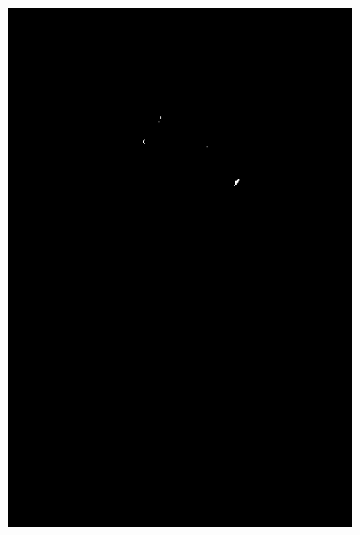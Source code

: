 \begin{figure}[h]
{\begin{subfigure}[b]{0.23\textwidth}
         \includegraphics[width=\textwidth]{images/results/cross/5_A_hgr2B_id10_1_ecu_hgr_bayes.png}
     \end{subfigure}}
     

\end{figure}
